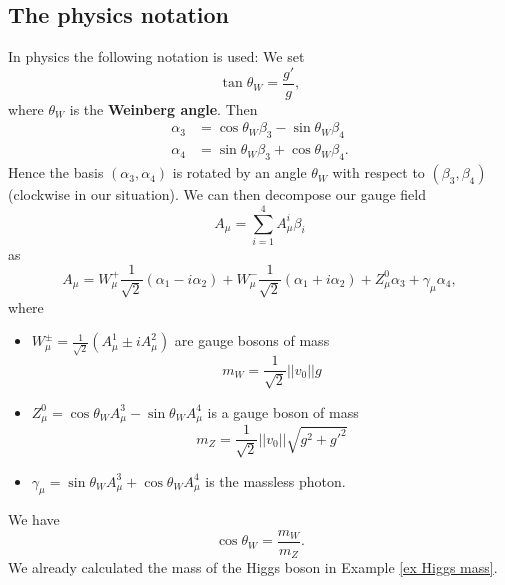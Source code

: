 \documentclass[12pt]{amsart}
\theoremstyle{definition}
\theoremstyle{remark}
\numberwithin{equation}{section}
\begin{document}
\subsection{The physics notation}
In physics the following notation is used: We set 
\begin{equation*}
\tan\theta_W=\frac{g'}{g},
\end{equation*}
where $\theta_W$ is the {\bf Weinberg angle}. Then 
\begin{align*}
\alpha_3&=\cos\theta_W\beta_3-\sin\theta_W\beta_4\\
\alpha_4&=\sin\theta_W\beta_3+\cos\theta_W\beta_4.
\end{align*}
Hence the basis $(\alpha_3,\alpha_4)$ is rotated by an angle $\theta_W$ with respect to $(\beta_3,\beta_4)$ (clockwise in our situation). We can then decompose our gauge field 
\begin{equation*}
A_\mu=\sum_{i=1}^4A_\mu^i\beta_i
\end{equation*}
as
\begin{equation*}
A_\mu=W^+_\mu\frac{1}{\sqrt{2}}(\alpha_1-i\alpha_2)+W^-_\mu\frac{1}{\sqrt{2}}(\alpha_1+i\alpha_2)+Z^0_\mu\alpha_3+\gamma_\mu\alpha_4,
\end{equation*}
where 
\begin{itemize}
\item $W^\pm_\mu=\frac{1}{\sqrt{2}}(A^1_\mu\pm iA^2_\mu)$ are gauge bosons of mass 
\begin{equation*}
m_W=\frac{1}{\sqrt{2}}||v_0||g
\end{equation*}
\item $Z^0_\mu=\cos\theta_WA^3_\mu-\sin\theta_WA^4_\mu$ is a gauge boson of mass 
\begin{equation*}
m_Z=\frac{1}{\sqrt{2}}||v_0||\sqrt{g^2+g'^2}
\end{equation*} 
\item $\gamma_\mu=\sin\theta_WA^3_\mu+\cos\theta_WA^4_\mu$ is the massless photon. 
\end{itemize}
We have 
\begin{equation*}
\cos\theta_W=\frac{m_W}{m_Z}.
\end{equation*}
We already calculated the mass of the Higgs boson in Example \ref{ex Higgs mass}.
\end{document}
